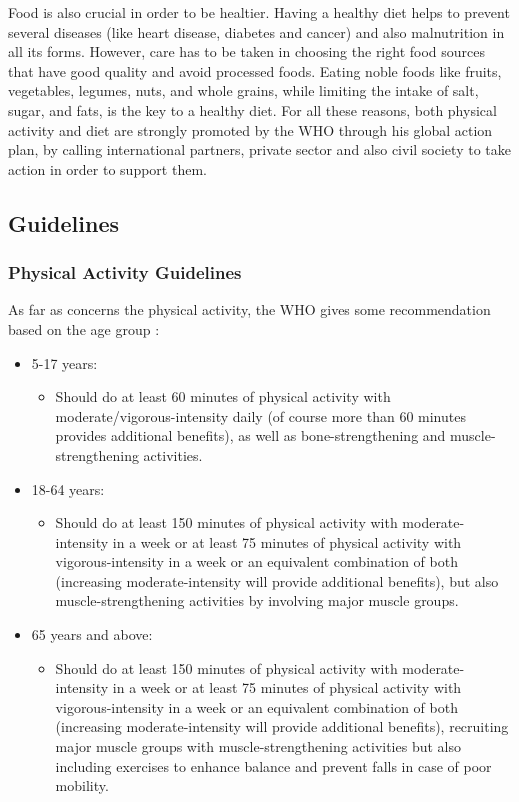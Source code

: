 \newline Food is also crucial in order to be healtier. Having a healthy diet helps to prevent several diseases (like heart disease, diabetes and cancer) and also malnutrition in all its forms. However, care has to be taken in choosing the right food sources that have good quality and avoid processed foods. Eating noble foods like fruits, vegetables, legumes, nuts, and whole grains, while limiting the intake of salt, sugar, and fats, is the key to a healthy diet. For all these reasons, both physical activity and diet are strongly promoted by the WHO through his global action plan, by calling international partners, private sector and also civil society to take action in order to support them. 
\subsection{Guidelines}
\subsubsection{Physical Activity Guidelines}
As far as concerns the physical activity, the WHO gives some recommendation based on the age group \cite{WhoPhysicalActivityGuidelines}:

\begin{itemize}[nosep] %
    \item 5-17 years:
          \begin{itemize}[nosep]
              \item Should do at least 60 minutes of physical activity with moderate/vigorous-intensity daily (of course more than 60 minutes provides additional benefits), as well as bone-strengthening and muscle-strengthening activities.
          \end{itemize}
          
    \item 18-64 years:
          \begin{itemize}[nosep]
              \item Should do at least 150 minutes of physical activity with moderate-intensity in a week or at least 75 minutes of physical activity with vigorous-intensity in a week or an equivalent combination of both (increasing moderate-intensity will provide additional benefits), but also muscle-strengthening activities by involving major muscle groups.
          \end{itemize}
          
    \item 65 years and above:
          \begin{itemize}[nosep]
              \item Should do at least 150 minutes of physical activity with moderate-intensity in a week or at least 75 minutes of physical activity with vigorous-intensity in a week or an equivalent combination of both (increasing moderate-intensity will provide additional benefits), recruiting major muscle groups with muscle-strengthening activities but also including exercises to enhance balance and prevent falls in case of poor mobility.
          \end{itemize}
\end{itemize}
